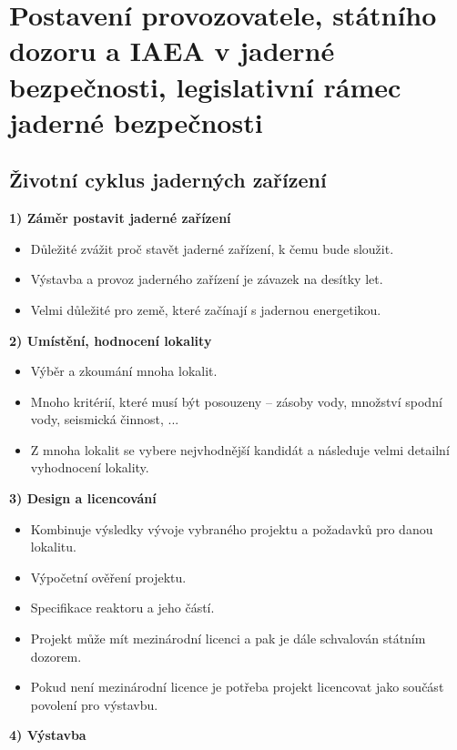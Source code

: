 \section[Legislativa jaderné bezpečnosti]{Postavení provozovatele, státního dozoru a IAEA v jaderné bezpečnosti, legislativní rámec jaderné bezpečnosti}

\subsection{Životní cyklus jaderných zařízení}

\textbf{1) Záměr postavit jaderné zařízení}

\begin{itemize}
    \item Důležité zvážit proč stavět jaderné zařízení, k čemu bude sloužit.
    \item Výstavba a provoz jaderného zařízení je závazek na desítky let.
    \item Velmi důležité pro země, které začínají s jadernou energetikou.
\end{itemize}

\textbf{2) Umístění, hodnocení lokality}

\begin{itemize}
    \item Výběr a zkoumání mnoha lokalit.
    \item Mnoho kritérií, které musí být posouzeny -- zásoby vody, množství spodní vody, seismická činnost, ...
    \item Z mnoha lokalit se vybere nejvhodnější kandidát a následuje velmi detailní vyhodnocení lokality.
\end{itemize}

\textbf{3) Design a licencování}

\begin{itemize}
    \item Kombinuje výsledky vývoje vybraného projektu a požadavků pro danou lokalitu.
    \item Výpočetní ověření projektu.
    \item Specifikace reaktoru a jeho částí.
    \item Projekt může mít mezinárodní licenci a pak je dále schvalován státním dozorem.
    \item Pokud není mezinárodní licence je potřeba projekt licencovat jako součást povolení pro výstavbu.
\end{itemize}

\textbf{4) Výstavba}

